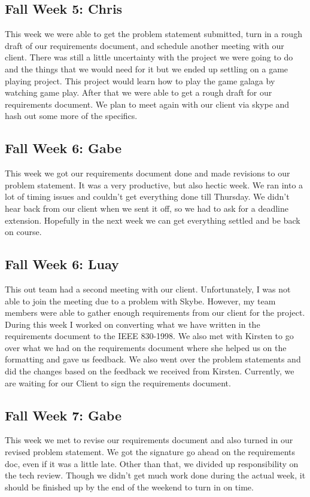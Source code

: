 \documentclass[onecolumn, draftclsnofoot,10pt, compsoc]{IEEEtran}
\begin{document}
\subsection{Fall Week 5: Chris}
This week we were able to get the problem statement submitted, turn in a rough draft of our requirements document, and schedule another meeting with our client. There was still a little uncertainty with the project we were going to do and the things that we would need for it but we ended up settling on a game playing project. This project would learn how to play the game galaga by watching game play. After that we were able to get a rough draft for our requirements document. We plan to meet again with our client via skype and hash out some more of the specifics.
\subsection{Fall Week 6: Gabe}
This week we got our requirements document done and made revisions to our problem statement. It was a very productive, but also hectic week. We ran into a lot of timing issues and couldn't get everything done till Thursday. We didn't hear back from our client when we sent it off, so we had to ask for a deadline extension. Hopefully in the next week we can get everything settled and be back on course.
\subsection{Fall Week 6: Luay}
This out team had a second meeting with our client. Unfortunately, I was not able to join the meeting due to a problem with Skybe. However, my team members were able to gather enough requirements from our client for the project. During this week I worked on converting what we have written in the requirements document to the IEEE 830-1998. We also met with Kirsten to go over what we had on the requirements document where she helped us on the formatting and gave us feedback. We also went over the problem statements and did the changes based on the feedback we received from Kirsten. Currently, we are waiting for our Client to sign the requirements document.
\subsection{Fall Week 7: Gabe}
This week we met to revise our requirements document and also turned in our revised problem statement. We got the signature go ahead on the requirements doc, even if it was a little late. Other than that, we divided up responsibility on the tech review. Though we didn't get much work done during the actual week, it should be finished up by the end of the weekend to turn in on time.
\end{document}

